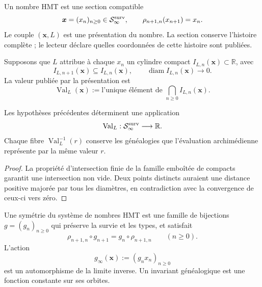 \begin{definition}
\label{p3-83-c44-s2:def:numero-hmt-cierre-genealogico}
Un nombre HMT est une section compatible
\[
 \boldsymbol x=(x_n)_{n\geq0}\in\mathcal S_\infty^{\rm surv},
 \qquad
 \rho_{n+1,n}(x_{n+1})=x_n.
\]
Le couple \((\boldsymbol x,L)\) est une présentation du nombre. La section
conserve l'histoire complète ; le lecteur déclare quelles coordonnées de cette
histoire sont publiées.
\end{definition}

\begin{definition}
\label{p3-83-c44-s2:def:valor-arquimediano-cierre-genealogico}
Supposons que \(L\) attribue à chaque \(x_n\) un cylindre compact
\(I_{L,n}(\boldsymbol x)\subset\mathbb R\), avec
\[
 I_{L,n+1}(\boldsymbol x)\subseteq I_{L,n}(\boldsymbol x),
 \qquad
 \operatorname{diam}I_{L,n}(\boldsymbol x)\longrightarrow0.
\]
La valeur publiée par la présentation est
\[
 \operatorname{Val}_L(\boldsymbol x)
 :=\text{l'unique élément de }
 \bigcap_{n\geq0}I_{L,n}(\boldsymbol x).
\]
\end{definition}

\begin{proposition}
\label{p3-83-c44-s2:prop:evaluacion-seccion-genealogica}
Les hypothèses précédentes déterminent une application
\[
 \operatorname{Val}_L:\mathcal S_\infty^{\rm surv}\longrightarrow\mathbb R.
\]
Chaque fibre \(\operatorname{Val}_L^{-1}(r)\) conserve les généalogies que
l'évaluation archimédienne représente par la même valeur \(r\).
\end{proposition}

\begin{proof}
La propriété d'intersection finie de la famille emboîtée de compacts
garantit une intersection non vide. Deux points distincts auraient une
distance positive majorée par tous les diamètres, en contradiction avec la
convergence de ceux-ci vers zéro.
\end{proof}

\begin{definition}
\label{p3-83-c44-s2:def:simetria-genealogica-hmt}
Une symétrie du système de nombres HMT est une famille de bijections
\(g=(g_n)_{n\geq0}\) qui préserve la survie et les types, et satisfait
\[
 \rho_{n+1,n}\circ g_{n+1}
 =g_n\circ\rho_{n+1,n}
 \qquad(n\geq0).
\]
L'action
\[
 g_\infty(\boldsymbol x):=(g_n x_n)_{n\geq0}
\]
est un automorphisme de la limite inverse. Un invariant généalogique est une
fonction constante sur ses orbites.
\end{definition}

